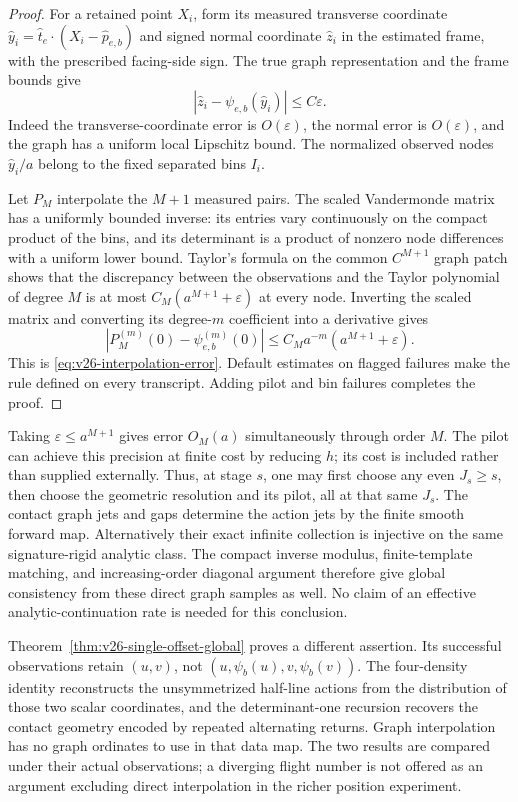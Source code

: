\begin{proof}
For a retained point \(X_i\), form its measured transverse coordinate
\(\widehat y_i=\widehat t_e\cdot(X_i-\widehat p_{e,b})\) and signed normal
coordinate \(\widehat z_i\) in the estimated frame, with the prescribed
facing-side sign.  The true graph representation and the frame bounds give
\[
 |\widehat z_i-\psi_{e,b}(\widehat y_i)|\le C\varepsilon.
\]
Indeed the transverse-coordinate error is \(O(\varepsilon)\), the normal
error is \(O(\varepsilon)\), and the graph has a uniform local Lipschitz
bound.  The normalized observed nodes \(\widehat y_i/a\) belong to the
fixed separated bins \(I_i\).

Let \(P_M\) interpolate the \(M+1\) measured pairs.  The scaled
Vandermonde matrix has a uniformly bounded inverse: its entries vary
continuously on the compact product of the bins, and its determinant is a
product of nonzero node differences with a uniform lower bound.  Taylor's
formula on the common \(C^{M+1}\) graph patch shows that the discrepancy
between the observations and the Taylor polynomial of degree \(M\) is at
most \(C_M(a^{M+1}+\varepsilon)\) at every node.  Inverting the scaled
matrix and converting its degree-\(m\) coefficient into a derivative gives
\[
 |P_M^{(m)}(0)-\psi_{e,b}^{(m)}(0)|
       \le C_Ma^{-m}(a^{M+1}+\varepsilon).
\]
This is \eqref{eq:v26-interpolation-error}.  Default estimates on flagged
failures make the rule defined on every transcript.  Adding pilot and bin
failures completes the proof.
\end{proof}

Taking \(\varepsilon\le a^{M+1}\) gives error \(O_M(a)\) simultaneously
through order \(M\).  The pilot can achieve this precision at finite cost
by reducing \(h\); its cost is included rather than supplied externally.
Thus, at stage \(s\), one may first choose any even \(J_s\ge s\), then
choose the geometric resolution and its pilot, all at that same \(J_s\).
The contact graph jets and gaps determine the action jets by the finite
smooth forward map.  Alternatively their exact infinite collection is
injective on the same signature-rigid analytic class.  The compact inverse
modulus, finite-template matching, and increasing-order diagonal argument
therefore give global consistency from these direct graph samples as well.
No claim of an effective analytic-continuation rate is needed for this
conclusion.

Theorem~\ref{thm:v26-single-offset-global} proves a different assertion.
Its successful observations retain \((u,v)\), not
\((u,\psi_b(u),v,\psi_b(v))\).  The four-density identity reconstructs the
unsymmetrized half-line actions from the distribution of those two scalar
coordinates, and the determinant-one recursion recovers the contact geometry
encoded by repeated alternating returns.  Graph interpolation has no graph
ordinates to use in that data map.  The two results are compared under their
actual observations; a diverging flight number is not offered as an argument
excluding direct interpolation in the richer position experiment.
